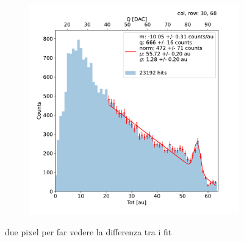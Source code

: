\begin{figure}[h!]
\begin{subfigure}{.5\textwidth}
            \includegraphics[width=.99\linewidth]{figures/charaterization/fit_line_gauss_r69.pdf}
            \label{fig:}
            \end{subfigure}
            \caption{due pixel per far vedere la differenza tra i fit}
        \end{figure}            

